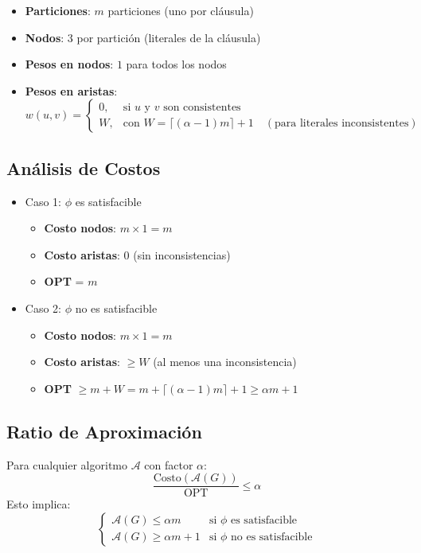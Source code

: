 \documentclass[letterpaper, 12pt]{report}
\begin{document}
\begin{itemize}
    \item \textbf{Particiones}: $m$ particiones (uno por cláusula)
    \item \textbf{Nodos}: 3 por partición (literales de la cláusula)
    \item \textbf{Pesos en nodos}: $1$ para todos los nodos
    \item \textbf{Pesos en aristas}:
    \[
    w(u,v) = 
    \begin{cases}
        0, & \text{si } u \text{ y } v \text{ son consistentes} \\
        W, & \text{con } W = \lceil (\alpha - 1)m \rceil + 1 \quad (\text{para literales inconsistentes})
    \end{cases}
    \]
\end{itemize}

\subsection{Análisis de Costos}
\begin{itemize}
    \item Caso 1: $\phi$ es satisfacible
    \begin{itemize}
        \item \textbf{Costo nodos}: $m \times 1 = m$
        \item \textbf{Costo aristas}: $0$ (sin inconsistencias)
        \item \textbf{OPT} = $m$
    \end{itemize}
    \item Caso 2: $\phi$ no es satisfacible
    \begin{itemize}
        \item \textbf{Costo nodos}: $m \times 1 = m$
        \item \textbf{Costo aristas}: $\geq W$ (al menos una inconsistencia)
        \item \textbf{OPT} $\geq m + W = m + \lceil (\alpha - 1)m \rceil + 1 \geq \alpha m + 1$
    \end{itemize}
\end{itemize}


\subsection{Ratio de Aproximación}
Para cualquier algoritmo $\mathcal{A}$ con factor $\alpha$:
\[
\frac{\text{Costo}(\mathcal{A}(G))}{\text{OPT}} \leq \alpha
\]
Esto implica:
\[
\begin{cases}
\mathcal{A}(G) \leq \alpha m & \text{si } \phi \text{ es satisfacible} \\
\mathcal{A}(G) \geq \alpha m + 1 & \text{si } \phi \text{ no es satisfacible}
\end{cases}
\]
\end{document}
